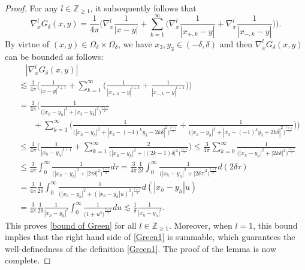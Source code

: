 \documentclass[10pt,reqno]{amsart}
\numberwithin{equation}{section}
\begin{document}
\begin{proof}
For any $l\in\mathbb{Z}_{\geqslant 1}$,  it subsequently follows that 
	\begin{equation*} 
		\nabla_x^lG_\delta(x,y)=\frac{1}{4\pi}\Big(\nabla_x^l\frac{1}{|x-y|}+\sum_{k=1}^\infty\big(\nabla_x^l\frac{1}{|x_{+,k}-y|}+\nabla_x^l\frac{1}{|x_{-,k}-y|}\big)\Big).
	\end{equation*}
By virtue of $(x,y)\in\Omega_\delta\times\Omega_\delta$, we have  $x_3,y_3\in(-\delta,\delta)$ and then  $\nabla_x^lG_\delta(x,y)$ can be bounded as follows:
\begin{align*}
	&\ \ \ \ |\nabla_x^lG_\delta(x,y)|\\
	&\lesssim\frac{1}{4\pi}\bigg(\frac{1}{|x-y|^{l+1}}+\sum_{k=1}^\infty\Big(\frac{1}{|x_{+,k}-y|^{l+1}}+\frac{1}{|x_{-,k}-y|^{l+1}}\Big)\bigg)\\
	&=\frac{1}{4\pi}\Bigg(\frac{1}{\big(|x_h-y_h|^2+|x_3-y_3|^2\big)^{\frac{l+1}{2}}}\\ 
	&\ \ \ \ \ \ \ \ +\sum_{k=1}^\infty\bigg(\frac{1}{\big(|x_h-y_h|^2+|x_3-(-1)^ky_3-2k\delta|^2\big)^{\frac{l+1}{2}}}+\frac{1}{\big(|x_h-y_h|^2+|x_3-(-1)^ky_3+2k\delta|^2\big)^{\frac{l+1}{2}}}\bigg)\Bigg)\\
	&\leqslant\frac{1}{4\pi}\Big(\frac{1}{|x_h-y_h|^{l+1}}+\sum_{k=1}^\infty\frac{2}{\big(|x_h-y_h|^2+|(2k-1)\delta|^2\big)^{\frac{l+1}{2}}}\Big)
	\leqslant\frac{3}{4\pi}\sum_{k=0}^\infty\frac{1}{\big(|x_h-y_h|^2+|2k\delta|^2\big)^{\frac{l+1}{2}}}\\
	&\leqslant \frac{3}{4\pi}\int_0^\infty\frac{1}{\big(|x_h-y_h|^2+|2\tau\delta|^2\big)^{\frac{l+1}{2}}}d\tau=\frac{3}{4\pi}\frac{1}{2\delta}\int_0^\infty\frac{1}{\big(|x_h-y_h|^2+|2\delta\tau|^2\big)^{\frac{l+1}{2}}}d(2\delta\tau)\\
	&=\frac{3}{4\pi}\frac{1}{2\delta}\int_0^\infty\frac{1}{\big(|x_h-y_h|^2+(|x_h-y_h|u)^2\big)^{\frac{l+1}{2}}}d(|x_h-y_h|u)\\
	&=\frac{3}{4\pi}\frac{1}{2\delta}\frac{1}{|x_h-y_h|^l}\int_0^\infty\frac{1}{\big(1+u^2\big)^{\frac{l+1}{2}}}du\lesssim\frac{1}{\delta}\frac{1}{|x_h-y_h|^l}.
\end{align*}
This proves \eqref{bound of Green} for all $l\in\mathbb{Z}_{\geqslant 1}$. 
Moreover, when $l=1$, this bound implies that the right hand side of \eqref{Green1} is summable, which guarantees the well-definedness of the definition  \eqref{Green1}. The proof of the lemma is now complete.
\end{proof}
\end{document}
